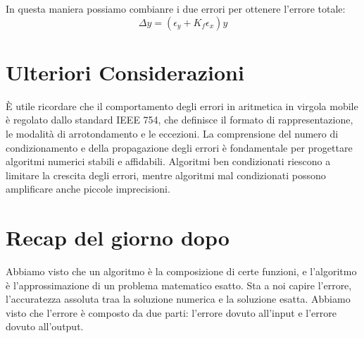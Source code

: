 \documentclass[letterpaper,12pt]{article}
\begin{document}
In questa maniera possiamo combianre i due errori per ottenere l'errore totale:
\[
    \Delta y = (\epsilon_y + K_f \epsilon_x) y
\]

\section*{Ulteriori Considerazioni}

È utile ricordare che il comportamento degli errori in aritmetica in virgola mobile è regolato dallo standard IEEE 754, 
che definisce il formato di rappresentazione, le modalità di arrotondamento e le eccezioni. La comprensione del numero 
di condizionamento e della propagazione degli errori è fondamentale per progettare algoritmi numerici stabili e affidabili.
Algoritmi ben condizionati riescono a limitare la crescita degli errori, mentre algoritmi mal condizionati possono 
amplificare anche piccole imprecisioni.

\section{Recap del giorno dopo}
Abbiamo visto che un algoritmo è la composizione di certe funzioni, e l'algoritmo è l'approssimazione di un problema 
matematico esatto. Sta a noi capire l'errore, l'accuratezza assoluta traa la soluzione numerica e la soluzione esatta.
Abbiamo visto che l'errore è composto da due parti: l'errore dovuto all'input e l'errore dovuto all'output. 
\end{document}
